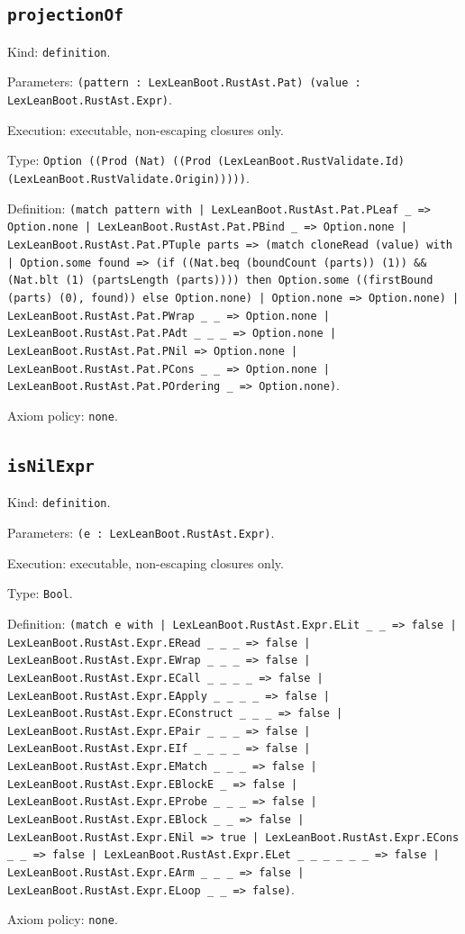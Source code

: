\documentclass[11pt]{article}
\begin{document}
\subsection*{\texttt{projectionOf}}
\noindent Kind: \texttt{definition}.\par
\noindent Parameters: \texttt{(pattern : LexLeanBoot.RustAst.Pat) (value : LexLeanBoot.RustAst.Expr)}.\par
\noindent Execution: executable, non-escaping closures only.\par
\noindent Type: \texttt{Option ((Prod (Nat) ((Prod (LexLeanBoot.RustValidate.Id) (LexLeanBoot.RustValidate.Origin)))))}.\par
\noindent Definition: \texttt{(match pattern with | LexLeanBoot.RustAst.Pat.PLeaf \_ => Option.none | LexLeanBoot.RustAst.Pat.PBind \_ => Option.none | LexLeanBoot.RustAst.Pat.PTuple parts => (match cloneRead (value) with | Option.some found => (if ((Nat.beq (boundCount (parts)) (1)) \&\& (Nat.blt (1) (partsLength (parts)))) then Option.some ((firstBound (parts) (0), found)) else Option.none) | Option.none => Option.none) | LexLeanBoot.RustAst.Pat.PWrap \_ \_ => Option.none | LexLeanBoot.RustAst.Pat.PAdt \_ \_ \_ => Option.none | LexLeanBoot.RustAst.Pat.PNil => Option.none | LexLeanBoot.RustAst.Pat.PCons \_ \_ => Option.none | LexLeanBoot.RustAst.Pat.POrdering \_ => Option.none)}.\par
\noindent Axiom policy: \texttt{none}.\par
\subsection*{\texttt{isNilExpr}}
\noindent Kind: \texttt{definition}.\par
\noindent Parameters: \texttt{(e : LexLeanBoot.RustAst.Expr)}.\par
\noindent Execution: executable, non-escaping closures only.\par
\noindent Type: \texttt{Bool}.\par
\noindent Definition: \texttt{(match e with | LexLeanBoot.RustAst.Expr.ELit \_ \_ => false | LexLeanBoot.RustAst.Expr.ERead \_ \_ \_ => false | LexLeanBoot.RustAst.Expr.EWrap \_ \_ \_ => false | LexLeanBoot.RustAst.Expr.ECall \_ \_ \_ \_ => false | LexLeanBoot.RustAst.Expr.EApply \_ \_ \_ \_ => false | LexLeanBoot.RustAst.Expr.EConstruct \_ \_ \_ => false | LexLeanBoot.RustAst.Expr.EPair \_ \_ \_ => false | LexLeanBoot.RustAst.Expr.EIf \_ \_ \_ \_ => false | LexLeanBoot.RustAst.Expr.EMatch \_ \_ \_ => false | LexLeanBoot.RustAst.Expr.EBlockE \_ => false | LexLeanBoot.RustAst.Expr.EProbe \_ \_ \_ => false | LexLeanBoot.RustAst.Expr.EBlock \_ \_ => false | LexLeanBoot.RustAst.Expr.ENil => true | LexLeanBoot.RustAst.Expr.ECons \_ \_ => false | LexLeanBoot.RustAst.Expr.ELet \_ \_ \_ \_ \_ \_ => false | LexLeanBoot.RustAst.Expr.EArm \_ \_ \_ => false | LexLeanBoot.RustAst.Expr.ELoop \_ \_ => false)}.\par
\noindent Axiom policy: \texttt{none}.\par
\end{document}
